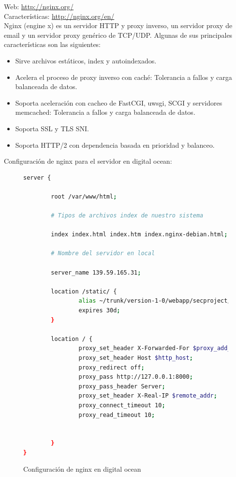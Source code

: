 Web: \url{http://nginx.org/}\\
Características: \url{http://nginx.org/en/}\\

Nginx (engine x) es un servidor HTTP y proxy inverso, un servidor proxy de email y un servidor proxy genérico de TCP/UDP. Algunas de sus principales características son las siguientes:\\

\begin{itemize}
\item Sirve archivos estáticos, index y autoindexados.
\item Acelera el proceso de proxy inverso con caché: Tolerancia a fallos y carga balanceada de datos.
\item Soporta aceleración con cacheo de FastCGI, uwsgi, SCGI y servidores memcached: Tolerancia a fallos y carga balanceada de datos.
\item Soporta SSL y TLS SNI.
\item Soporta HTTP/2 con dependencia basada en prioridad y balanceo.
\end{itemize}

Configuración de nginx para el servidor en digital ocean:

\begin{figure}[H]
\begin{lstlisting}[language=bash]
server {

        root /var/www/html;

        # Tipos de archivos index de nuestro sistema

        index index.html index.htm index.nginx-debian.html;

        # Nombre del servidor en local

        server_name 139.59.165.31;

        location /static/ {
                alias ~/trunk/version-1-0/webapp/secproject/static/;
                expires 30d;
        }

        location / {
                proxy_set_header X-Forwarded-For $proxy_add_x_forwarded_for;
                proxy_set_header Host $http_host;
                proxy_redirect off;
                proxy_pass http://127.0.0.1:8000;
                proxy_pass_header Server;
                proxy_set_header X-Real-IP $remote_addr;
                proxy_connect_timeout 10;
                proxy_read_timeout 10;


        }
}
\end{lstlisting}
\caption{Configuración de nginx en digital ocean}
\end{figure}

